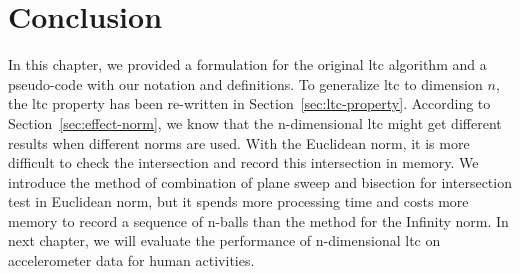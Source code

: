\section{Conclusion}
In this chapter, we provided a formulation for the original \acrshort{ltc} algorithm and a
pseudo-code with our notation and definitions. To generalize \acrshort{ltc} to
dimension $n$, the \acrshort{ltc} property has been re-written in
Section~\ref{sec:ltc-property}. According to Section~\ref{sec:effect-norm}, we
know that the n-dimensional \acrshort{ltc} might get different results when
different norms are used. With the Euclidean norm, it is more difficult to check the
intersection and record this intersection in memory. We introduce the method of
combination of plane sweep and bisection for intersection test in Euclidean
norm, but it spends more processing time and costs more memory to record a
sequence of n-balls than the method for the Infinity norm. In next chapter, we
will evaluate the performance of n-dimensional \acrshort{ltc} on accelerometer
data for human activities. 
